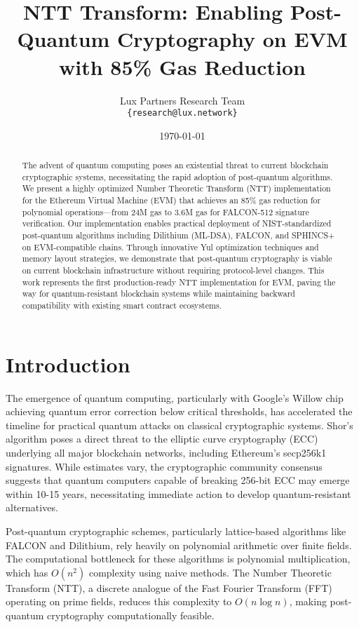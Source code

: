 \documentclass[11pt,a4paper]{article}
\title{NTT Transform: Enabling Post-Quantum Cryptography on EVM\\with 85\% Gas Reduction}
\author{Lux Partners Research Team\\
\texttt{\{research@lux.network\}}}
\date{\today}
\begin{document}
\maketitle

\begin{abstract}
The advent of quantum computing poses an existential threat to current blockchain cryptographic systems, necessitating the rapid adoption of post-quantum algorithms. We present a highly optimized Number Theoretic Transform (NTT) implementation for the Ethereum Virtual Machine (EVM) that achieves an 85\% gas reduction for polynomial operations—from 24M gas to 3.6M gas for FALCON-512 signature verification. Our implementation enables practical deployment of NIST-standardized post-quantum algorithms including Dilithium (ML-DSA), FALCON, and SPHINCS+ on EVM-compatible chains. Through innovative Yul optimization techniques and memory layout strategies, we demonstrate that post-quantum cryptography is viable on current blockchain infrastructure without requiring protocol-level changes. This work represents the first production-ready NTT implementation for EVM, paving the way for quantum-resistant blockchain systems while maintaining backward compatibility with existing smart contract ecosystems.
\end{abstract}

\section{Introduction}

The emergence of quantum computing, particularly with Google's Willow chip achieving quantum error correction below critical thresholds, has accelerated the timeline for practical quantum attacks on classical cryptographic systems. Shor's algorithm poses a direct threat to the elliptic curve cryptography (ECC) underlying all major blockchain networks, including Ethereum's secp256k1 signatures. While estimates vary, the cryptographic community consensus suggests that quantum computers capable of breaking 256-bit ECC may emerge within 10-15 years, necessitating immediate action to develop quantum-resistant alternatives.

Post-quantum cryptographic schemes, particularly lattice-based algorithms like FALCON and Dilithium, rely heavily on polynomial arithmetic over finite fields. The computational bottleneck for these algorithms is polynomial multiplication, which has $O(n^2)$ complexity using naive methods. The Number Theoretic Transform (NTT), a discrete analogue of the Fast Fourier Transform (FFT) operating on prime fields, reduces this complexity to $O(n \log n)$, making post-quantum cryptography computationally feasible.
\end{document}

